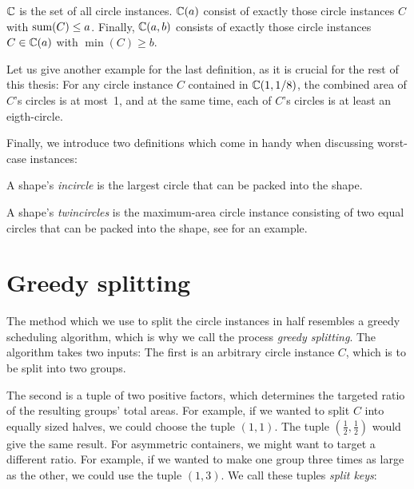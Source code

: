 \documentclass[a4paper,style=print,bibliography=totoc,nexus,lnum,extramargin]{tubsbook}
\begin{document}
\begin{definition}
    $\mathbb{C}$ is the set of all circle instances. $\mathbb{C}(a)$ consist of exactly those circle instances $C$ with $\operatorname{sum}(C) \le a$. Finally, $\mathbb{C}(a,b)$ consists of exactly those circle instances $C \in \mathbb{C}(a)$ with $\min(C) \ge b$.
\end{definition}

Let us give another example for the last definition, as it is crucial for the rest of this thesis: For any circle instance $C$ contained in $\mathbb{C}(1,1/8)$, the combined area of $C$'s circles is at most~1, and at the same time, each of $C$'s circles is at least an eigth-circle.

Finally, we introduce two definitions which come in handy when discussing worst-case instances:

\begin{definition}
    A shape's \emph{incircle} is the largest circle that can be packed into the shape.
\end{definition}

\begin{definition}
    A shape's \emph{twincircles} is the maximum-area circle instance consisting of two equal circles that can be packed into the shape, see  for an example.%
\end{definition}


\section{Greedy splitting}

The method which we use to split the circle instances in half resembles a greedy scheduling algorithm, which is why we call the process \emph{greedy splitting}. The algorithm takes two inputs: The first is an arbitrary circle instance $C$, which is to be split into two groups.

The second is a tuple of two positive factors, which determines the targeted ratio of the resulting groups' total areas. For example, if we wanted to split $C$ into equally sized halves, we could choose the tuple $(1,1)$. The tuple $(\frac 1 2,\frac 1 2)$ would give the same result.
For asymmetric containers, we might want to target a different ratio. For example, if we wanted to make one group three times as large as the other, we could use the tuple $(1,3)$. We call these tuples \emph{split keys}:
\end{document}
